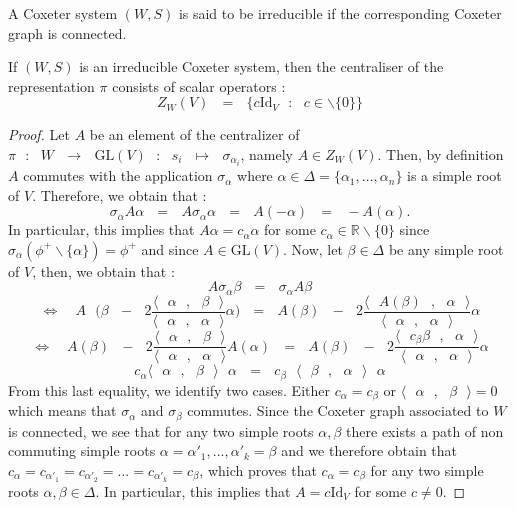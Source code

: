 \documentclass[envcountsame,envcountchap]{svmono}
\newcommand{\R}{\mathbb R}
\newcommand{\prods}[2]{\langle\qq #1\qq,\qq#2\qq\rangle}
\newcommand{\fct}[4]{\qq:\qq #1\qq\longrightarrow\qq #2\qq :\qq #3\qq \mapsto\qq #4}
\newcommand{\q}{\quad}
\newcommand{\qq}{\text{ }}
\begin{document}
\begin{definition}
	A Coxeter system $(W,S)$ is said to be irreducible if the corresponding Coxeter graph is connected. 
\end{definition}
\begin{lemma}
	If $(W,S)$ is an irreducible Coxeter system, then the centraliser of the representation $\pi$ consists of scalar operators :
	\begin{equation}
	Z_W(V)\qq=\qq\{c\mbox{Id}_V\qq:\qq c\in \backslash\{0\}\}
	\end{equation} 
\end{lemma}
\begin{proof}
	Let $A$ be an element of the centralizer of $\pi\fct{W}{\mbox{GL}(V)}{s_i}{\sigma_{\alpha_i}}$, namely $A\in Z_W(V)$. Then, by definition $A$ commutes with the application $\sigma_\alpha$ where $\alpha\in \Delta=\{\alpha_1,...,\alpha_n\}$ is a simple root of $V$. Therefore, we obtain that :
	\begin{equation}
	\sigma_\alpha A\alpha\qq=\qq A\sigma_\alpha\alpha\qq=\qq A(-\alpha) \qq=\qq -A(\alpha).
	\end{equation}
	In particular, this implies that $A\alpha=c_\alpha\alpha$ for some $c_\alpha\in \R\backslash\{0\}$ since $\sigma_\alpha(\phi^+\backslash\{\alpha\})=\phi^+$ and since $A\in \mbox{GL}(V)$. Now, let $\beta\in\Delta$ be any simple root of $V$, then, we obtain that :
	\begin{equation*}
	A\sigma_\alpha\beta\qq=\qq \sigma_\alpha A\beta
	\end{equation*}
	\begin{equation*}
	\iff \q A\qq \big(\beta\qq-\qq 2\frac{\prods{\alpha}{\beta}}{\prods{\alpha}{\alpha}}\alpha\big)\qq=\qq A(\beta)\qq -\qq 2\frac{\prods{A(\beta)}{\alpha}}{\prods{\alpha}{\alpha}}\alpha
	\end{equation*}
	\begin{equation*}
	\iff \q A(\beta)\qq-\qq 2\frac{\prods{\alpha}{\beta}}{\prods{\alpha}{\alpha}}A(\alpha)\qq=\qq A(\beta)\qq -\qq 2\frac{\prods{c_\beta\beta}{\alpha}}{\prods{\alpha}{\alpha}}\alpha
	\end{equation*}
	\begin{equation*}
	c_\alpha\prods{\alpha}{\beta}\qq\alpha \qq =\qq c_\beta\qq \prods{\beta}{\alpha}\qq \alpha
	\end{equation*}
	From this last equality, we identify two cases. Either $c_\alpha=c_\beta$ or $\prods{\alpha}{\beta}=0$ which means that $\sigma_\alpha$ and $\sigma_\beta$ commutes. Since the Coxeter graph associated to $W$ is connected, we see that for any two simple roots $\alpha,\beta$ there exists a path of non commuting simple roots $\alpha=\alpha'_1,...,\alpha'_k=\beta$ and we therefore obtain that $c_\alpha=c_{\alpha'_1}=c_{\alpha'_2}=...=c_{\alpha'_k}=c_\beta$, which proves that $c_\alpha=c_\beta$ for any two simple roots $\alpha,\beta\in \Delta$. In particular, this implies that $A=c\mbox{Id}_V$ for some $c\not=0$.
\end{proof}
\end{document}

